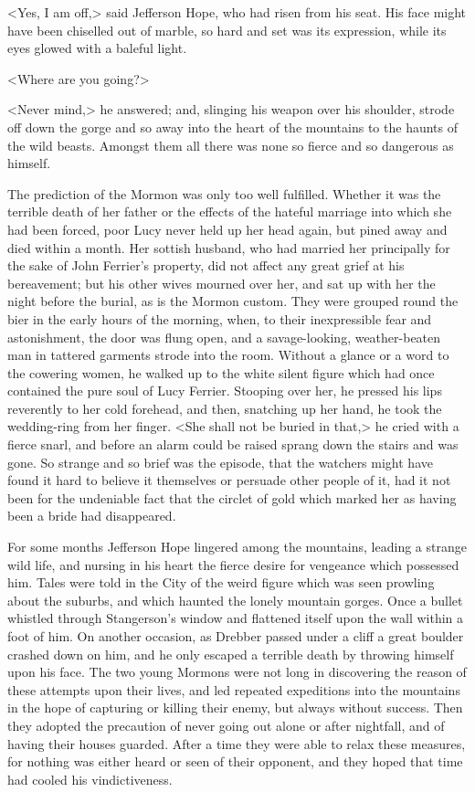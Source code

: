 <Yes, I am off,> said Jefferson Hope, who had risen from his seat. His face might have been chiselled out of marble, so hard and set was its expression, while its eyes glowed with a baleful light.

<Where are you going?>

<Never mind,> he answered; and, slinging his weapon over his shoulder, strode off down the gorge and so away into the heart of the mountains to the haunts of the wild beasts. Amongst them all there was none so fierce and so dangerous as himself.

The prediction of the Mormon was only too well fulfilled. Whether it was the terrible death of her father or the effects of the hateful marriage into which she had been forced, poor Lucy never held up her head again, but pined away and died within a month. Her sottish husband, who had married her principally for the sake of John Ferrier's property, did not affect any great grief at his bereavement; but his other wives mourned over her, and sat up with her the night before the burial, as is the Mormon custom. They were grouped round the bier in the early hours of the morning, when, to their inexpressible fear and astonishment, the door was flung open, and a savage-looking, weather-beaten man in tattered garments strode into the room. Without a glance or a word to the cowering women, he walked up to the white silent figure which had once contained the pure soul of Lucy Ferrier. Stooping over her, he pressed his lips reverently to her cold forehead, and then, snatching up her hand, he took the wedding-ring from her finger. <She shall not be buried in that,> he cried with a fierce snarl, and before an alarm could be raised sprang down the stairs and was gone. So strange and so brief was the episode, that the watchers might have found it hard to believe it themselves or persuade other people of it, had it not been for the undeniable fact that the circlet of gold which marked her as having been a bride had disappeared.

For some months Jefferson Hope lingered among the mountains, leading a strange wild life, and nursing in his heart the fierce desire for vengeance which possessed him. Tales were told in the City of the weird figure which was seen prowling about the suburbs, and which haunted the lonely mountain gorges. Once a bullet whistled through Stangerson's window and flattened itself upon the wall within a foot of him. On another occasion, as Drebber passed under a cliff a great boulder crashed down on him, and he only escaped a terrible death by throwing himself upon his face. The two young Mormons were not long in discovering the reason of these attempts upon their lives, and led repeated expeditions into the mountains in the hope of capturing or killing their enemy, but always without success. Then they adopted the precaution of never going out alone or after nightfall, and of having their houses guarded. After a time they were able to relax these measures, for nothing was either heard or seen of their opponent, and they hoped that time had cooled his vindictiveness.

